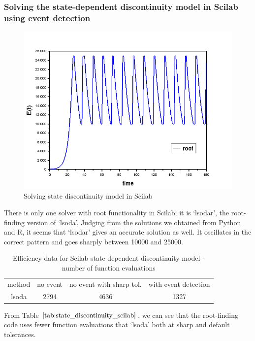 \subsubsection{Solving the state-dependent discontinuity model in Scilab using event detection}
\begin{figure}[H]
\centering
\includegraphics[width=0.7\linewidth]{./figures/solve_state_discontinuity_scilab}
\caption{Solving state discontinuity model in Scilab}
\label{fig:solve_state_discontinuity_scilab}
\end{figure}
There is only one solver with root functionality in Scilab; it is `lsodar', the root-finding version of `lsoda'. Judging from the solutions we obtained from Python and R, it seems that `lsodar' gives an accurate solution as well. It oscillates in the correct pattern and goes sharply between 10000 and 25000.

\begin{table}[h]
\caption {Efficiency data for Scilab state-dependent discontinuity model - number of function evaluations} \label{tab:state_discontinuity_scilab}
\begin{center}
\begin{tabular}{ c c c c } 
method & no event & no event with sharp tol. & with event detection \\ 
lsoda & 2794 & 4636 & 1327 \\
\end{tabular}
\end{center}
\end{table}

From Table $\ref{tab:state_discontinuity_scilab}$, we can see that the root-finding code uses fewer function evaluations that `lsoda' both at sharp and default tolerances.

